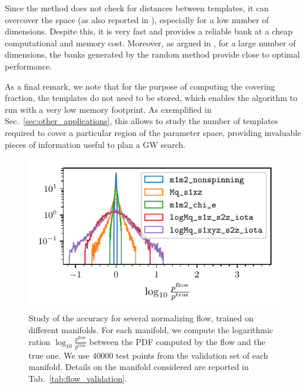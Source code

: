 \documentclass[twocolumn,showpacs,preprintnumbers,nofootinbib,prd,
superscriptaddress,10pt]{revtex4-2}
\begin{document}
Since the method does not check for distances between templates, it can overcover the space (as also reported in \cite{Messenger:2008ta, Coogan:2022qxs}), especially for a low number of dimensions.
Despite this, it is very fast and provides a reliable bank at a cheap computational and memory cost.
Moreover, as argued in \cite{Messenger:2008ta, Allen:2021yuy, Allen:2022lqr}, for a large number of dimensions, the banks generated by the random method provide close to optimal performance.

As a final remark, we note that for the purpose of computing the covering fraction, the templates do not need to be stored, which enables the algorithm to run with a very low memory footprint.
As exemplified in Sec.~\ref{sec:other_applications}, this allows to study the number of templates required to cover a particular region of the parameter space, providing invaluable pieces of information useful to plan a GW search.

\begin{figure}[t]
	\centering
	\includegraphics[scale = 1.]{flow_validation}
	\caption{Study of the accuracy for several normalizing flow, trained on different manifolds. For each manifold, we compute the logarithmic ration $\log_{10}\frac{p^\mathrm{flow}}{p^\mathrm{true}}$ between the PDF computed by the flow and the true one. We use $40000$ test points from the validation set of each manifold. Details on the manifold considered are reported in Tab.~\ref{tab:flow_validation}.}
	\label{fig:flow_validation}
\end{figure}
\end{document}
